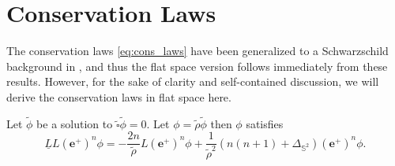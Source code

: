\section{Conservation Laws}
\label{sec:conservationlaws}

The conservation laws \eqref{eq:cons_laws} have been generalized to a Schwarzschild background in \cite{Keh21_a}, and thus the flat space version follows immediately from these results. However, for the sake of clarity and self-contained discussion, we will derive the conservation laws in flat space here.

\begin{proposition}\label{prop:main_commutation}
  Let $\tilde{\phi}$ be a solution to $\tilde{\square}\tilde{\phi}=0.$ Let $\phi = \tilde{\rho}\tilde{\phi}$ then $\phi$ satisfies
  \begin{equation}\label{eq:main_commutation}
     \underline{L} L (\boldsymbol{e}^{+})^n \phi = -\frac{2n}{\tilde{\rho}}L (\boldsymbol{e}^{+})^n
     \phi + \frac{1}{\tilde{\rho}^2}(n(n+1) + \Delta_{\mathbb{S}^2})(\boldsymbol{e}^+)^n \phi.
  \end{equation}
\end{proposition}
\pagebreak
